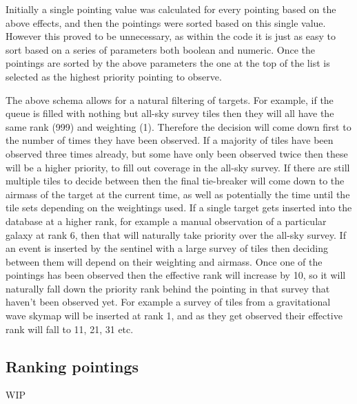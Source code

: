 \begin{colsection}
\begin{colsection}
\begin{itemize}
\end{itemize}

Initially a single pointing value was calculated for every pointing based on the above effects, and then the pointings were sorted based on this single value. However this proved to be unnecessary, as within the  code it is just as easy to sort based on a series of parameters both boolean and numeric. Once the pointings are sorted by the above parameters the one at the top of the list is selected as the highest priority pointing to observe.

The above schema allows for a natural filtering of targets. For example, if the queue is filled with nothing but all-sky survey tiles then they will all have the same rank (999) and weighting (1). Therefore the decision will come down first to the number of times they have been observed. If a majority of tiles have been observed three times already, but some have only been observed twice then these will be a higher priority, to fill out coverage in the all-sky survey. If there are still multiple tiles to decide between then the final tie-breaker will come down to the airmass of the target at the current time, as well as potentially the time until the tile sets depending on the weightings used. If a single target gets inserted into the database at a higher rank, for example a manual observation of a particular galaxy at rank 6, then that will naturally take priority over the all-sky survey. If an event is inserted by the sentinel with a large survey of tiles then deciding between them will depend on their weighting and airmass. Once one of the pointings has been observed then the effective rank will increase by 10, so it will naturally fall down the priority rank behind the pointing in that survey that haven't been observed yet. For example a survey of tiles from a gravitational wave skymap will be inserted at rank 1, and as they get observed their effective rank will fall to 11, 21, 31 etc.


\end{colsection}


\subsection{Ranking pointings}
\label{sec:ranking}
\begin{colsection}

WIP

\end{colsection}

\end{colsection}

